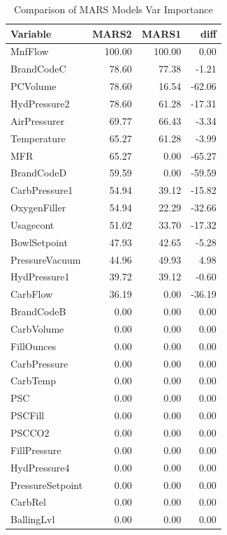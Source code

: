 \documentclass[]{report}
\begin{document}
\begin{table}[H]

\caption{\label{tab:unnamed-chunk-9}Comparison of MARS Models Var Importance}
\centering
\fontsize{8}{10}\selectfont
\begin{tabular}{l|r|r|r}
\hline
Variable & MARS2 & MARS1 & diff\\
\hline
\rowcolor{gray!6}  MnfFlow & 100.00 & 100.00 & 0.00\\
\hline
BrandCodeC & 78.60 & 77.38 & -1.21\\
\hline
\rowcolor{gray!6}  PCVolume & 78.60 & 16.54 & -62.06\\
\hline
HydPressure2 & 78.60 & 61.28 & -17.31\\
\hline
\rowcolor{gray!6}  AirPressurer & 69.77 & 66.43 & -3.34\\
\hline
Temperature & 65.27 & 61.28 & -3.99\\
\hline
\rowcolor{gray!6}  MFR & 65.27 & 0.00 & -65.27\\
\hline
BrandCodeD & 59.59 & 0.00 & -59.59\\
\hline
\rowcolor{gray!6}  CarbPressure1 & 54.94 & 39.12 & -15.82\\
\hline
OxygenFiller & 54.94 & 22.29 & -32.66\\
\hline
\rowcolor{gray!6}  Usagecont & 51.02 & 33.70 & -17.32\\
\hline
BowlSetpoint & 47.93 & 42.65 & -5.28\\
\hline
\rowcolor{gray!6}  PressureVacuum & 44.96 & 49.93 & 4.98\\
\hline
HydPressure1 & 39.72 & 39.12 & -0.60\\
\hline
\rowcolor{gray!6}  CarbFlow & 36.19 & 0.00 & -36.19\\
\hline
BrandCodeB & 0.00 & 0.00 & 0.00\\
\hline
\rowcolor{gray!6}  CarbVolume & 0.00 & 0.00 & 0.00\\
\hline
FillOunces & 0.00 & 0.00 & 0.00\\
\hline
\rowcolor{gray!6}  CarbPressure & 0.00 & 0.00 & 0.00\\
\hline
CarbTemp & 0.00 & 0.00 & 0.00\\
\hline
\rowcolor{gray!6}  PSC & 0.00 & 0.00 & 0.00\\
\hline
PSCFill & 0.00 & 0.00 & 0.00\\
\hline
\rowcolor{gray!6}  PSCCO2 & 0.00 & 0.00 & 0.00\\
\hline
FillPressure & 0.00 & 0.00 & 0.00\\
\hline
\rowcolor{gray!6}  HydPressure4 & 0.00 & 0.00 & 0.00\\
\hline
PressureSetpoint & 0.00 & 0.00 & 0.00\\
\hline
\rowcolor{gray!6}  CarbRel & 0.00 & 0.00 & 0.00\\
\hline
BallingLvl & 0.00 & 0.00 & 0.00\\
\hline
\end{tabular}
\end{table}
\end{document}
